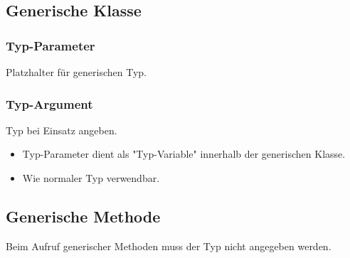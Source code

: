 \subsection{Generische Klasse}
\vspace{-0.7\abovedisplayskip}
\begin{minipage}[t]{0.5\columnwidth}
    \subsubsection{Typ-Parameter}
    Platzhalter für generischen Typ.
    
\end{minipage}\hfill
\begin{minipage}[t]{0.5\columnwidth}
    \subsubsection{Typ-Argument}
    Typ bei Einsatz angeben.
    
\end{minipage}

\begin{itemize}
    \item Typ-Parameter dient als "Typ-Variable" innerhalb der generischen Klasse.
    \item Wie normaler Typ verwendbar.
\end{itemize}

\subsection{Generische Methode}

\begin{minipage}[t]{0.5\columnwidth}
    \vspace{-0.8\abovedisplayskip}
    
\end{minipage}\hfill%
\begin{minipage}[t]{0.49\columnwidth}
    \raggedright%
    Beim Aufruf generischer Methoden muss der Typ nicht angegeben werden.
\end{minipage}


